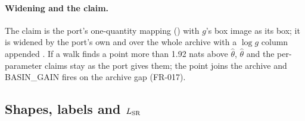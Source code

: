 \paragraph{Widening and the claim.} The claim is the port's one-quantity mapping () with
$g$'s box image as its box; it is widened by the port's own  and  over the
whole archive with a $\log g$ column appended . If a walk finds a point more than 1.92 nats
above $\hat\theta$, $\hat\theta$ and the per-parameter claims stay as the port gives them; the point joins the
archive and BASIN\_GAIN fires on the archive gap (FR-017).

\subsection{Shapes, labels and $L_{\rm SR}$}\label{sec:pj-shapes}

